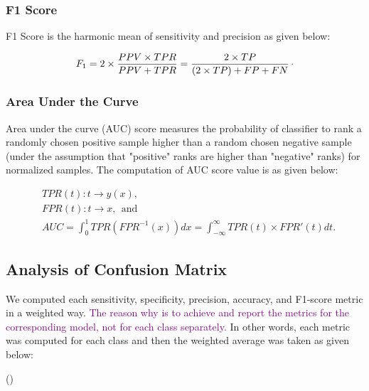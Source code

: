 \subsubsection*{F1 Score}

F1 Score is the harmonic mean of sensitivity and precision as given below:

\begin{equation}
\label{eq:F1_Score}
    F_{1} = 2 \times \frac{PPV \times TPR}{PPV + TPR} = \frac{2 \times TP}{(2 \times TP) + FP + FN}\raisepunct{.}
\end{equation}

 
\subsubsection*{Area Under the Curve}

Area under the curve (AUC) score measures the probability of classifier to rank a randomly chosen positive sample higher than a random chosen negative sample (under the assumption that "positive" ranks are higher than "negative" ranks) for normalized samples. The computation of AUC score value is as given below:

\begin{align}
\label{eq:AUC_Score}
    \nonumber
    & TPR(t) : t \rightarrow y \left ( x \right ), \\
    \nonumber
    & FPR(t) : t \rightarrow x, \:\: \text{and} \\ 
    & AUC = \int_{0}^{1} TPR \left ( FPR^{-1}\left ( x \right ) \right ) dx = \int_{-\infty}^{\infty} TPR \left ( t \right ) \times {FPR}' \left ( t \right ) dt.
\end{align}


\subsection{Analysis of Confusion Matrix}

We computed each sensitivity, specificity, precision, accuracy, and F1-score metric in a weighted way. \textcolor{purple}{The reason why is to achieve and report the metrics for the corresponding model, not for each class separately.} In other words, each metric was computed for each class and then the weighted average was taken as given below:

\be
\label{eq:weighted_avg_metric}
 {()} \:\: 
\ee

